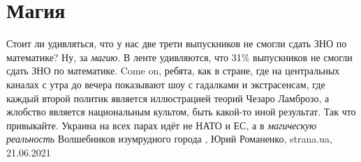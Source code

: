  
 
 
 
 
\chapter{Магия}
\label{sec:slova.magia}

Стоит ли удивляться, что у нас две трети выпускников не смогли сдать ЗНО по
математике?  Ну, за \emph{магию}.  В ленте удивляются, что 31\% выпускников не
смогли сдать ЗНО по математике. Come on, ребята, как в стране, где на
центральных каналах с утра до вечера показывают шоу с гадалками и экстрасенсам,
где каждый второй политик является иллюстрацией теорий Чезаро Ламброзо, а
жлобство является национальным культом, быть какой-то иной результат.  Так что
привыкайте. Украина на всех парах идёт не НАТО и ЕС, а в \emph{магическую
реальность} Волшебников изумрудного города
, 
Юрий Романенко, strana.ua, 21.06.2021
